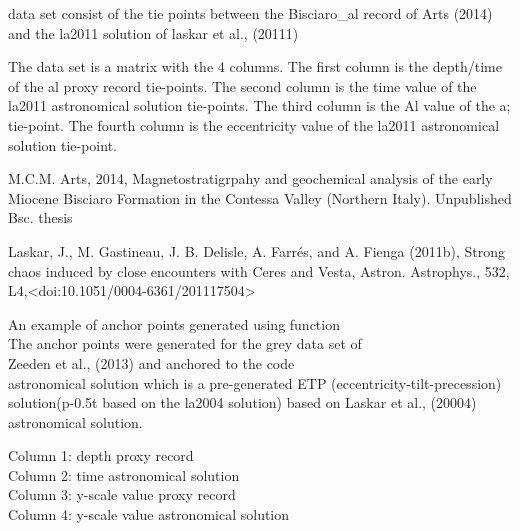 \documentclass[a4paper]{book}
\begin{document}
%
\begin{Description}
data set consist of the tie points between the Bisciaro\_al record
of Arts (2014) and the la2011 solution of laskar et al., (20111)\\{}
\end{Description}
%
\begin{Details}
The data set is a matrix with the 4 columns.
The first column is the depth/time of the al proxy record tie-points.
The second column is the time value of the la2011 astronomical solution tie-points.
The third column is the Al value of the a; tie-point.
The fourth column is the eccentricity value of the la2011 astronomical solution tie-point.
\end{Details}
%
\begin{References}
M.C.M. Arts, 2014,
Magnetostratigrpahy and geochemical analysis of the early Miocene Bisciaro Formation
in the Contessa Valley (Northern Italy). Unpublished Bsc. thesis \\{}

Laskar, J., M. Gastineau, J. B. Delisle, A. Farrés, and A. Fienga (2011b),
Strong chaos induced by close encounters with Ceres and Vesta, Astron. Astrophys.,
532, L4,<doi:10.1051/0004-6361/201117504> \\{}
\end{References}
%
\begin{Description}
An example of anchor points generated using  function \\{}
The anchor points were generated for the  grey data set of \\{}
Zeeden et al., (2013) and anchored to the code \\{}
astronomical solution which is a pre-generated ETP (eccentricity-tilt-precession) \\{}
solution(p-0.5t based on the la2004 solution) based on Laskar et al., (20004) \\{}
astronomical solution.
\end{Description}
%
\begin{Details}
Column 1: depth proxy record\\{}
Column 2: time astronomical solution  \\{}
Column 3: y-scale value proxy record\\{}
Column 4: y-scale value astronomical solution  \\{}
\end{Details}
\end{document}
